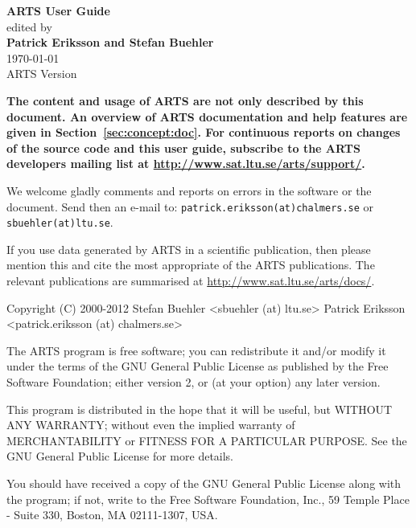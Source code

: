 \documentclass[11pt,twoside,a4paper,fleqn]{book}
\begin{document}
%
\renewcommand{\thepage}{title \arabic{page}} 

\thispagestyle{plain}
\begin{center}
  \vspace*{1cm}
  {\Huge \bf ARTS User Guide\\}
  \vspace*{1cm}
  {\large edited by \\}
  \vspace*{1cm}
  {\Large \bf Patrick Eriksson and Stefan Buehler }\\
   \vspace*{2cm}
   {\large \today\\
    ARTS Version 
   }
\end{center}
\vspace*{\fill}
{\normalsize \bf
  \noindent
  The content and usage of ARTS are not only described by this
  document. An overview of ARTS documentation and help features are
  given in Section~\ref{sec:concept:doc}. For continuous reports on
  changes of the source code and this user guide, subscribe to the
  ARTS developers mailing list at \url{http://www.sat.ltu.se/arts/support/}.

  We welcome gladly comments and reports on errors in the software or the
  document. Send then an e-mail to: \verb|patrick.eriksson(at)chalmers.se| or
  \verb|sbuehler(at)ltu.se|.

  If you use data generated by ARTS in a scientific publication, then please
  mention this and cite the most appropriate of the ARTS publications. The
  relevant publications are summarised at
  \url{http://www.sat.ltu.se/arts/docs/}. }

\newpage                          
\thispagestyle{empty}
\vspace*{\fill}
\noindent
\begin{code}
Copyright (C) 2000-2012
Stefan Buehler <sbuehler (at) ltu.se>
Patrick Eriksson <patrick.eriksson (at) chalmers.se>

The ARTS program is free software; you can redistribute it
and/or modify it under the terms of the GNU General Public
License as published by the Free Software Foundation; either
version 2, or (at your option) any later version.

This program is distributed in the hope that it will be
useful, but WITHOUT ANY WARRANTY; without even the implied
warranty of MERCHANTABILITY or FITNESS FOR A PARTICULAR
PURPOSE. See the GNU General Public License for more
details. 

You should have received a copy of the GNU General Public
License along with the program; if not, write to the Free
Software Foundation, Inc., 59 Temple Place - Suite 330,
Boston, MA 02111-1307, USA. 
\end{code}
\end{document}
